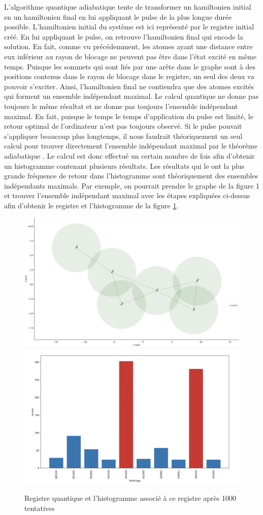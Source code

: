 \documentclass[11pt]{article}
\begin{document}
L'algorithme quantique adiabatique tente de transformer un hamiltonien initial en un hamiltonien final en lui appliquant le pulse de la plus longue durée possible. L'hamiltonien initial du système est ici représenté par le registre initial créé. En lui appliquant le pulse, on retrouve l'hamiltonien final qui encode la solution. En fait, comme vu précédemment, les atomes ayant une distance entre eux inférieur au rayon de blocage ne peuvent pas être dans l'état excité en même temps. Puisque les sommets qui sont liés par une arête dans le graphe sont à des positions contenus dans le rayon de blocage dans le registre, un seul des deux va pouvoir s'exciter. Ainsi, l'hamiltonien final ne contiendra que des atomes excités qui forment un ensemble indépendant maximal. Le calcul quantique ne donne pas toujours le même résultat et ne donne pas toujours l'ensemble indépendant maximal. En fait, puisque le temps le temps d'application du pulse est limité, le retour optimal de l'ordinateur n'est pas toujours observé. Si le pulse pouvait s'appliquer beaucoup plus longtemps, il nous faudrait théoriquement un seul calcul pour trouver directement l'ensemble indépendant maximal par le théorème adiabatique \cite{amin_consistency_2009}. Le calcul est donc effectué un certain nombre de fois afin d'obtenir un histogramme contenant plusieurs résultats. Les résultats qui  le ont la plus grande fréquence de retour dans l'histogramme sont théoriquement des ensembles indépendants maximals. Par exemple, on pourrait prendre le graphe de la figure 1 et trouver l'ensemble indépendant maximal avec les étapes expliquées ci-dessus afin d'obtenir le registre et l'histogramme de la figure \ref{QMIS_exemple}.
\begin{figure}[H]
    \centering
    \includegraphics[width = 0.48\linewidth]{images/registre_exemple.png}
    \includegraphics[width=0.49\linewidth]{images/histo_qaa_exemple.png}
    \caption{Registre quantique et l'histogramme associé à ce registre après 1000 tentatives}
    \label{QMIS_exemple}
\end{figure}
    
\end{document}
